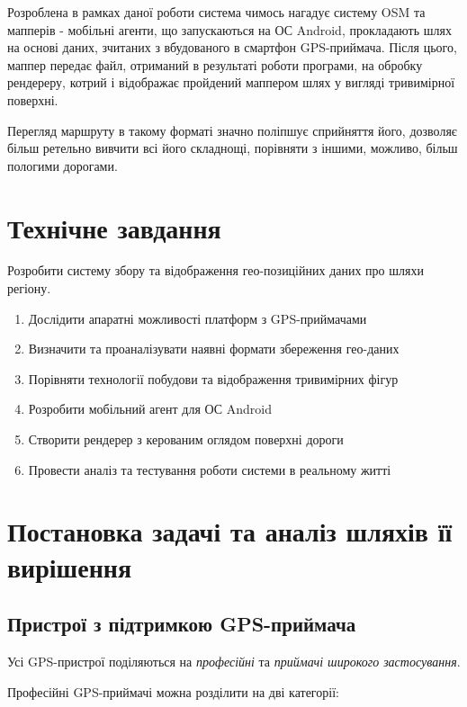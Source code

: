 \documentclass[simple,a4paper,14pt,ukrainian,utf8]{eskdtext}
\begin{document}
    Розроблена в рамках даної роботи система чимось нагадує систему OSM та мапперів - мобільні агенти, що запускаються на ОС Android, прокладають шлях на основі даних, зчитаних з вбудованого в смартфон GPS-приймача\cite{website:gps_receiver}. Після цього, маппер передає файл, отриманий в результаті роботи програми, на обробку рендереру, котрий і відображає пройдений маппером шлях у вигляді тривимірної поверхні.
    
    Перегляд маршруту в такому форматі значно поліпшує сприйняття його, дозволяє більш ретельно вивчити всі його складнощі, порівняти з іншими, можливо, більш пологими дорогами.

\newpage \section{Технічне завдання}

    Розробити систему збору та відображення гео-позиційних даних про шляхи регіону.

    \begin{enumerate}
        \item Дослідити апаратні можливості платформ з GPS-приймачами
        \item Визначити та проаналізувати наявні формати збереження гео-даних
        \item Порівняти технології побудови та відображення тривимірних фігур
        \item Розробити мобільний агент для ОС Android
        \item Створити рендерер з керованим оглядом поверхні дороги
        \item Провести аналіз та тестування роботи системи в реальному житті
    \end{enumerate}

\newpage \section{Постановка задачі та аналіз шляхів її вирішення}

    \subsection{Пристрої з підтримкою GPS-приймача}
    
    Усі GPS-пристрої поділяються на \textit{професійні} та \textit{приймачі широкого застосування}.
	
	Професійні GPS-приймачі можна розділити на дві категорії:
    
\end{document}
